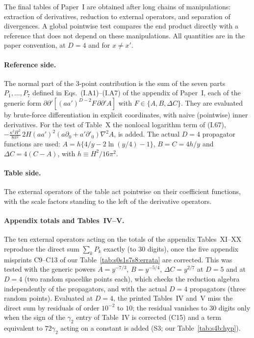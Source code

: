 \documentclass[aps,prd,onecolumn,10pt,nofootinbib,floatfix]{revtex4-2}
\newcommand{\eqI}[1]{(I.#1)}
\begin{document}
The final tables of Paper~I are obtained after long chains of manipulations: extraction of derivatives, reduction to external
operators, and separation of divergences. A global pointwise test compares the end product directly with a reference that does not
depend on these manipulations. All quantities are in the paper convention, at $D=4$ and for $x\neq x'$.

\paragraph*{Reference side.} The normal part of the 3-point contribution is the sum of the seven parts $P_1,\dots,P_7$ defined in
Eqs.~\eqI{A1}--\eqI{A7} of the appendix of Paper~I, each of the generic form $\partial\partial'[(aa')^{D-2}F\,\partial\partial'A]$ with
$F\in\{A,B,\Delta C\}$. They are evaluated by brute-force differentiation in explicit coordinates, with naive (pointwise) inner
derivatives. For the test of Table~X the nonlocal logarithm term of \eqI{67},
$-\frac{\kappa^2H^2}{8\pi^2}\,2H(aa')^2(a\partial_0+a'\partial'_0)\nabla^2A$, is added. The actual $D=4$ propagator functions are
used: $A=h\{4/y-2\ln(y/4)-1\}$, $B=C=4h/y$ and $\Delta C=4(C-A)$, with $h\equiv H^2/16\pi^2$.

\paragraph*{Table side.} The external operators of the table act pointwise on their coefficient functions, with the scale factors
standing to the left of the derivative operators.

\paragraph*{Appendix totals and Tables~IV--V.} The ten external operators acting on the totals of the appendix Tables~XI--XX reproduce
the direct sum $\sum_kP_k$ exactly (to 30 digits), once the five appendix misprints C9--C13 of our Table~\ref{tab:s0s1s7s8:errata} are
corrected. This was tested with the generic powers $A=y^{-7/3}$, $B=y^{-5/4}$, $\Delta C=y^{2/7}$ at $D=5$ and at $D=4$ (two random
spacelike points each), which checks the reduction algebra independently of the propagators, and with the actual $D=4$ propagators
(three random points). Evaluated at $D=4$, the printed Tables~IV and~V miss the direct sum by residuals of order $10^{-2}$ to $10$; the residual vanishes
to 30 digits only when the sign of the $\gamma_2$ entry of Table~IV is corrected (C15) and a term equivalent to $72\gamma_2$
acting on a constant is added (S3; our Table~\ref{tab:s4b:hyp}).
\end{document}
